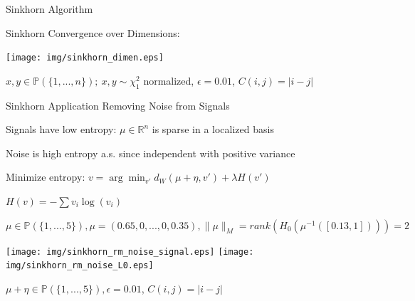 \documentclass[10pt]{beamer}
\newcommand{\R}{{\mathbb{R}}}
\newcommand{\PP}{{\mathbb{P}}}
\newcommand{\1}{{\mathbbm{1}}}
\begin{document}
\begin{frame}{Sinkhorn Algorithm}

Sinkhorn Convergence over Dimensions: \pause

\begin{center}
    
\texttt{[image: img/sinkhorn\_dimen.eps]} \pause

$ x,y\in\PP(\{1,...,n\});\ x,y \sim \chi^2_1 $ normalized, $\epsilon=0.01$, $C(i,j)=|i-j|$

\end{center}

\end{frame}

\begin{frame}{Sinkhorn Application}
 \pause
Removing Noise from Signals \pause

Signals have low entropy: $\mu\in\R^n$ is sparse in a localized basis \pause

Noise is high entropy a.s. since independent with positive variance \pause

Minimize entropy: $ v=\arg\min_{v'} d_W(\mu+\eta,v') + \lambda H(v')$ \pause

$H(v) = - \sum v_i \log(v_i)$ \pause

$ \mu \in\PP(\{1,...,5\}), \mu = (0.65,0,...,0,0.35), \|\mu\|_M = rank(H_0(\mu^{-1}([0.13,1]))) = 2$ \pause

\begin{center}
    
\texttt{[image: img/sinkhorn\_rm\_noise\_signal.eps]} \pause
\texttt{[image: img/sinkhorn\_rm\_noise\_L0.eps]} \pause

$ \mu+\eta \in\PP(\{1,...,5\}), \epsilon=0.01$, $C(i,j)=|i-j|$

\end{center}

\end{frame}
\end{document}
